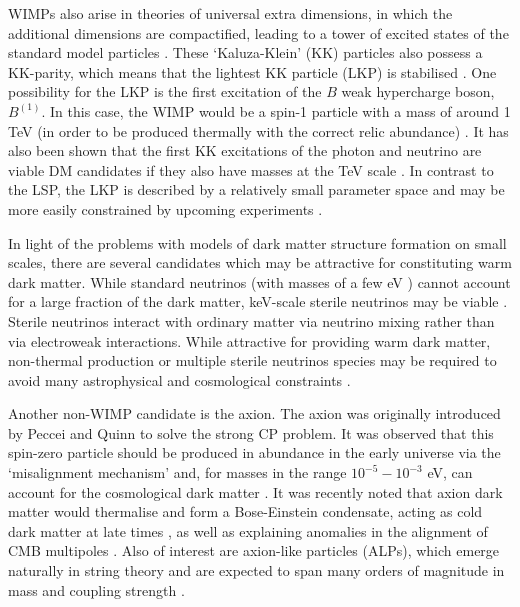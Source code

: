 WIMPs also arise in theories of universal extra dimensions, in which the additional dimensions are compactified, leading to a tower of excited states of the standard model particles \cite{Duff:1994}. These `Kaluza-Klein' (KK) particles also possess a KK-parity, which means that the lightest KK particle (LKP) is stabilised \cite{Appelquist:2001}. One possibility for the LKP is the first excitation of the $B$ weak hypercharge boson, $B^{(1)}$. In this case, the WIMP would be a spin-1 particle with a mass of around 1 TeV (in order to be produced thermally with the correct relic abundance) \cite{Cheng:2002}. It has also been shown that the first KK excitations of the photon and neutrino are viable DM candidates if they also have masses at the TeV scale \cite{Servant:2002}. In contrast to the LSP, the LKP is described by a relatively small parameter space and may be more easily constrained by upcoming experiments \cite{Bergstrom:2009}.

In light of the problems with models of dark matter structure formation on small scales, there are several candidates which may be attractive for constituting warm dark matter. While standard neutrinos (with masses of a few eV \cite{Amsler:2008}) cannot account for a large fraction of the dark matter, keV-scale sterile neutrinos may be viable \cite{Dodelson:1994}. Sterile neutrinos interact with ordinary matter via neutrino mixing rather than via electroweak interactions. While attractive for providing warm dark matter, non-thermal production \cite{Shi:1999} or multiple sterile neutrinos species \cite{Asaka:2006} may be required to avoid many astrophysical and cosmological constraints \cite{Hansen:2002,Abazajian:2006}.

Another non-WIMP candidate is the axion. The axion was originally introduced by Peccei and Quinn \cite{Peccei:1977} to solve the strong CP problem. It was observed that this spin-zero particle should be produced in abundance in the early universe via the `misalignment mechanism' and, for masses in the range $10^{-5} - 10^{-3}$ eV, can account for the cosmological dark matter \cite{Raffelt:1995}. It was recently noted that axion dark matter would thermalise and form a Bose-Einstein condensate, acting as cold dark matter at late times \cite{Sikivie:2009}, as well as explaining anomalies in the alignment of CMB multipoles \cite{Copi:2010}. Also of interest are axion-like particles (ALPs), which emerge naturally in string theory and are expected to span many orders of magnitude in mass and coupling strength \cite{Arvanitaki:2009}.

